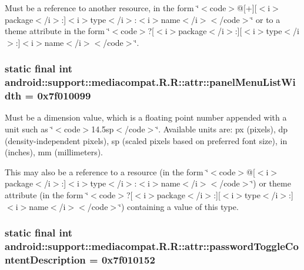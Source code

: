 Must be a reference to another resource, in the form \char`\"{}$<$code$>$@\mbox{[}+\mbox{]}\mbox{[}$<$i$>$package$<$/i$>$:\mbox{]}$<$i$>$type$<$/i$>$:$<$i$>$name$<$/i$>$$<$/code$>$\char`\"{} or to a theme attribute in the form \char`\"{}$<$code$>$?\mbox{[}$<$i$>$package$<$/i$>$:\mbox{]}\mbox{[}$<$i$>$type$<$/i$>$:\mbox{]}$<$i$>$name$<$/i$>$$<$/code$>$\char`\"{}. \hypertarget{classandroid_1_1support_1_1mediacompat_1_1_r_1_1attr_edfe8d667c9f50cbd9e1b61e6969cf11}{
\subsubsection[{panelMenuListWidth}]{\setlength{\rightskip}{0pt plus 5cm}static final int android::support::mediacompat.R.R::attr::panelMenuListWidth = 0x7f010099}}
\label{classandroid_1_1support_1_1mediacompat_1_1_r_1_1attr_edfe8d667c9f50cbd9e1b61e6969cf11}


Must be a dimension value, which is a floating point number appended with a unit such as \char`\"{}$<$code$>$14.5sp$<$/code$>$\char`\"{}. Available units are: px (pixels), dp (density-independent pixels), sp (scaled pixels based on preferred font size), in (inches), mm (millimeters). 

This may also be a reference to a resource (in the form \char`\"{}$<$code$>$@\mbox{[}$<$i$>$package$<$/i$>$:\mbox{]}$<$i$>$type$<$/i$>$:$<$i$>$name$<$/i$>$$<$/code$>$\char`\"{}) or theme attribute (in the form \char`\"{}$<$code$>$?\mbox{[}$<$i$>$package$<$/i$>$:\mbox{]}\mbox{[}$<$i$>$type$<$/i$>$:\mbox{]}$<$i$>$name$<$/i$>$$<$/code$>$\char`\"{}) containing a value of this type. \hypertarget{classandroid_1_1support_1_1mediacompat_1_1_r_1_1attr_29138538bd7ce1c48d1fb5dee74ba6c7}{
\subsubsection[{passwordToggleContentDescription}]{\setlength{\rightskip}{0pt plus 5cm}static final int android::support::mediacompat.R.R::attr::passwordToggleContentDescription = 0x7f010152}}
\label{classandroid_1_1support_1_1mediacompat_1_1_r_1_1attr_29138538bd7ce1c48d1fb5dee74ba6c7}


